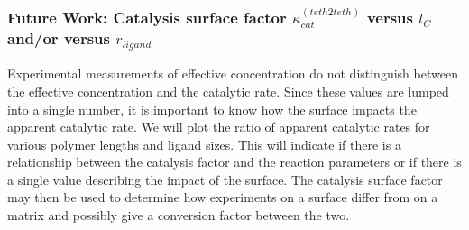 \documentclass[../../AdvancementSummary.tex]{subfiles}
\begin{document}
\subsubsection{Future Work: Catalysis surface factor $\kappa^{(teth2teth)}_{cat}$ versus $l_C$ and/or versus $r_{ligand}$}

Experimental measurements of effective concentration do not distinguish between the effective concentration and the catalytic rate. Since these values are lumped into a single number, it is important to know how the surface impacts the apparent catalytic rate. We will plot the ratio of apparent catalytic rates for various polymer lengths and ligand sizes. This will indicate if there is a relationship between the catalysis factor and the reaction parameters or if there is a single value describing the impact of the surface. The catalysis surface factor may then be used to determine how experiments on a surface differ from on a matrix and possibly give a conversion factor between the two. 










\end{document}
